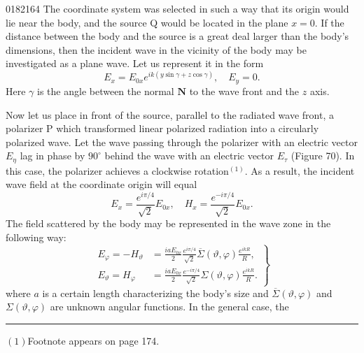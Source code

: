 \begin{scanpage}{0182}{164}
The coordinate system was selected in such a way that its origin would lie near the body, and the source Q would be located in the plane $x=0$. If the distance between the body and the source is a great deal larger than the body's dimensions, then the incident wave in the vicinity of the body may be investigated as a plane wave. Let us represent it in the form
\[
E_x=E_{0x}e^{ik(y\sin\gamma+z\cos\gamma)},\quad E_y=0.\tag{26.01}
\]
Here $\gamma$ is the angle between the normal $\mathbf N$ to the wave front and the $z$ axis.

Now let us place in front of the source, parallel to the radiated wave front, a polarizer P which transformed linear polarized radiation into a circularly polarized wave. Let the wave passing through the polarizer with an electric vector $E_\eta$ lag in phase by $90^\circ$ behind the wave with an electric vector $E_\tau$ (Figure 70). In this case, the polarizer achieves a clockwise rotation$^{(1)}$. As a result, the incident wave field at the coordinate origin will equal
\[
E_x=\frac{e^{i\pi/4}}{\sqrt2}E_{0x},\quad H_x=\frac{e^{-i\pi/4}}{\sqrt2}E_{0x}.\tag{26.02}
\]
The field scattered by the body may be represented in the wave zone in the following way:
\[
\left.\begin{aligned}E_\varphi=-H_\vartheta&=\frac{iaE_{0x}}2\frac{e^{i\pi/4}}{\sqrt2}\overline\Sigma(\vartheta,\varphi)\frac{e^{ikR}}R,\\
E_\vartheta=H_\varphi&=\frac{iaE_{0x}}2\frac{e^{-i\pi/4}}{\sqrt2}\Sigma(\vartheta,\varphi)\frac{e^{ikR}}R.
\end{aligned}\right\}\tag{26.03}
\]
where $a$ is a certain length characterizing the body's size and $\overline\Sigma(\vartheta,\varphi)$ and $\Sigma(\vartheta,\varphi)$ are unknown angular functions. In the general case, the
\par\bigskip\hrule\smallskip
$(1)$Footnote appears on page 174.
\end{scanpage}
